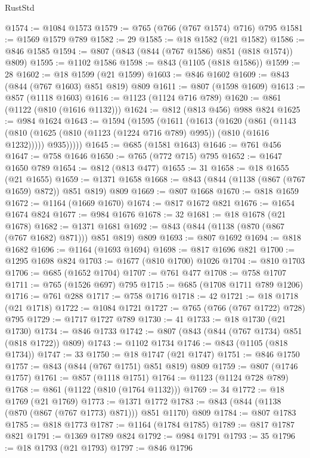 \begin{lexlean}{RustStd}
\begin{coremodule}
@1574 := @1084 @1573
@1579 := @765 (@766 (@767 @1574) @716) @795
@1581 := @1569 @1579 @789
@1582 := 29
@1585 := @18 @1582 (@21 @1582)
@1586 := @846 @1585
@1594 := @807 (@843 (@844 (@767 @1586) @851 (@818 @1574)) @809)
@1595 := @1102 @1586
@1598 := @843 (@1105 (@818 @1586))
@1599 := 28
@1602 := @18 @1599 (@21 @1599)
@1603 := @846 @1602
@1609 := @843 (@844 (@767 @1603) @851 @819) @809
@1611 := @807 (@1598 @1609)
@1613 := @857 (@1118 @1603)
@1616 := @1123 (@1124 @716 @789)
@1620 := @861 (@1122 (@810 (@1616 @1132)))
@1624 := @812 (@813 @456) @988 @824
@1625 := @984 @1624
@1643 := @1594
    (@1595
      (@1611
        (@1613
          (@1620
            (@861
              (@1143 (@810 (@1625 (@810 (@1123 (@1224 @716 @789) @995)) (@810 (@1616 @1232)))))
              @935)))))
@1645 := @685 (@1581 @1643)
@1646 := @761 @456
@1647 := @758 @1646
@1650 := @765 (@772 @715) @795
@1652 := @1647 @1650 @789
@1654 := @812 (@813 @477)
@1655 := 31
@1658 := @18 @1655 (@21 @1655)
@1659 := @1371 @1658
@1668 := @843 (@844 (@1138 (@867 (@767 @1659) @872)) @851 @819) @809
@1669 := @807 @1668
@1670 := @818 @1659
@1672 := @1164 (@1669 @1670)
@1674 := @817 @1672 @821
@1676 := @1654 @1674 @824
@1677 := @984 @1676
@1678 := 32
@1681 := @18 @1678 (@21 @1678)
@1682 := @1371 @1681
@1692 := @843 (@844 (@1138 (@870 (@867 (@767 @1682) @871))) @851 @819) @809
@1693 := @807 @1692
@1694 := @818 @1682
@1696 := @1164 (@1693 @1694)
@1698 := @817 @1696 @821
@1700 := @1295 @1698 @824
@1703 := @1677 (@810 @1700) @1026
@1704 := @810 @1703
@1706 := @685 (@1652 @1704)
@1707 := @761 @477
@1708 := @758 @1707
@1711 := @765 (@1526 @697) @795
@1715 := @685 (@1708 @1711 @789 @1206)
@1716 := @761 @288
@1717 := @758 @1716
@1718 := 42
@1721 := @18 @1718 (@21 @1718)
@1722 := @1084 @1721
@1727 := @765 (@766 (@767 @1722) @728) @795
@1729 := @1717 @1727 @789
@1730 := 41
@1733 := @18 @1730 (@21 @1730)
@1734 := @846 @1733
@1742 := @807 (@843 (@844 (@767 @1734) @851 (@818 @1722)) @809)
@1743 := @1102 @1734
@1746 := @843 (@1105 (@818 @1734))
@1747 := 33
@1750 := @18 @1747 (@21 @1747)
@1751 := @846 @1750
@1757 := @843 (@844 (@767 @1751) @851 @819) @809
@1759 := @807 (@1746 @1757)
@1761 := @857 (@1118 @1751)
@1764 := @1123 (@1124 @728 @789)
@1768 := @861 (@1122 (@810 (@1764 @1132)))
@1769 := 34
@1772 := @18 @1769 (@21 @1769)
@1773 := @1371 @1772
@1783 := @843 (@844 (@1138 (@870 (@867 (@767 @1773) @871))) @851 @1170) @809
@1784 := @807 @1783
@1785 := @818 @1773
@1787 := @1164 (@1784 @1785)
@1789 := @817 @1787 @821
@1791 := @1369 @1789 @824
@1792 := @984 @1791
@1793 := 35
@1796 := @18 @1793 (@21 @1793)
@1797 := @846 @1796

\end{coremodule}
\end{lexlean}
